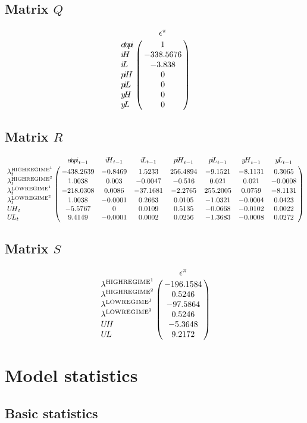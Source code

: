 \subsection*{Matrix $Q$}

$$\bordermatrix{
~ & \epsilon^{\pi} \cr
{e\!t\!a\!p\!i} & 1 \cr
{i\!H} & -338.5676 \cr
{i\!L} & -3.838 \cr
{p\!i\!H} & 0 \cr
{p\!i\!L} & 0 \cr
{y\!H} & 0 \cr
{y\!L} & 0 \cr
}$$

\subsection*{Matrix $R$}

$$\bordermatrix{
~ & {e\!t\!a\!p\!i}_{t-1} & {i\!H}_{t-1} & {i\!L}_{t-1} & {p\!i\!H}_{t-1} & {p\!i\!L}_{t-1} & {y\!H}_{t-1} & {y\!L}_{t-1} \cr
\lambda^{\mathrm{HIGHREGIME}^{\mathrm{1}}}_{t} & -438.2639 & -0.8469 & 1.5233 & 256.4894 & -9.1521 & -8.1131 & 0.3065 \cr
\lambda^{\mathrm{HIGHREGIME}^{\mathrm{2}}}_{t} & 1.0038 & 0.003 & -0.0047 & -0.516 & 0.021 & 0.021 & -0.0008 \cr
\lambda^{\mathrm{LOWREGIME}^{\mathrm{1}}}_{t} & -218.0308 & 0.0086 & -37.1681 & -2.2765 & 255.2005 & 0.0759 & -8.1131 \cr
\lambda^{\mathrm{LOWREGIME}^{\mathrm{2}}}_{t} & 1.0038 & -0.0001 & 0.2663 & 0.0105 & -1.0321 & -0.0004 & 0.0423 \cr
{U\!H}_{t} & -5.5767 & 0 & 0.0109 & 0.5135 & -0.0668 & -0.0102 & 0.0022 \cr
{U\!L}_{t} & 9.4149 & -0.0001 & 0.0002 & 0.0256 & -1.3683 & -0.0008 & 0.0272 \cr
}$$

\subsection*{Matrix $S$}

$$\bordermatrix{
~ & \epsilon^{\pi} \cr
\lambda^{\mathrm{HIGHREGIME}^{\mathrm{1}}} & -196.1584 \cr
\lambda^{\mathrm{HIGHREGIME}^{\mathrm{2}}} & 0.5246 \cr
\lambda^{\mathrm{LOWREGIME}^{\mathrm{1}}} & -97.5864 \cr
\lambda^{\mathrm{LOWREGIME}^{\mathrm{2}}} & 0.5246 \cr
{U\!H} & -5.3648 \cr
{U\!L} & 9.2172 \cr
}$$


\section{Model statistics}

\subsection{Basic statistics}

